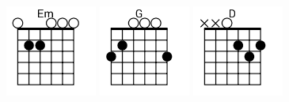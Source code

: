 \begin{figure}[h]
\predtitle\centering
\includegraphics[width=3cm]{../Akordy/em.png}
\includegraphics[width=3cm]{../Akordy/g.png}
\includegraphics[width=3cm]{../Akordy/d.png}
\end{figure}

